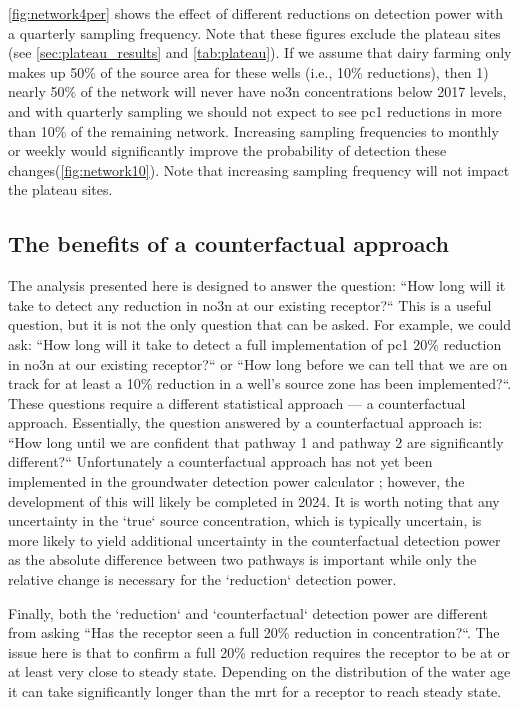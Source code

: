 \autoref{fig:network4per} shows the effect of different reductions on detection power with a quarterly sampling frequency. Note that these figures exclude the plateau sites (see \autoref{sec:plateau_results} and \autoref{tab:plateau}). If we assume that dairy farming only makes up 50\% of the source area for these wells (i.e., 10\% reductions), then 1) nearly 50\% of the network will never have \gls{no3n} concentrations below 2017 levels, and with quarterly sampling we should not expect to see \gls{pc1} reductions in more than 10\% of the remaining network. Increasing sampling frequencies to monthly or weekly would significantly improve the probability of detection these changes(\autoref{fig:network10}).  Note that increasing sampling frequency will not impact the plateau sites.

\subsection[counterfactual approach]{The benefits of a counterfactual approach} \label{sec:counterfactual}

The analysis presented here is designed to answer the question: ``How long will it take to detect any reduction in \gls{no3n} at our existing receptor?`` This is a useful question, but it is not the only question that can be asked. For example, we could ask: ``How long will it take to detect a full implementation of \gls{pc1} 20\% reduction in \gls{no3n} at our existing receptor?`` or ``How long before we can tell that we are on track for at least a 10\% reduction in a well's source zone has been implemented?``.
These questions require a different statistical approach --- a counterfactual approach. Essentially, the question answered by a counterfactual approach is: ``How long until we are confident that pathway 1 and pathway 2 are significantly different?`` Unfortunately a counterfactual approach has not yet been implemented in the groundwater detection power calculator %
; however, the development of this will likely be completed in 2024. It is worth noting that any uncertainty in the `true` source concentration, which is typically uncertain, is more likely to yield additional uncertainty in the counterfactual detection power as the absolute difference between two pathways is important while only the relative change is necessary for the `reduction` detection power.

Finally, both the `reduction` and `counterfactual` detection power are different from asking ``Has the receptor seen a full 20\% reduction in concentration?``. The issue here is that to confirm a full 20\% reduction requires the receptor to be at or at least very close to steady state. Depending on the distribution of the water age it can take significantly longer than the \gls{mrt} for a receptor to reach steady state.

